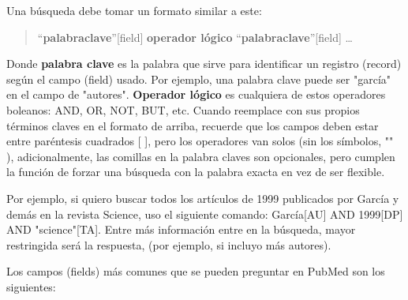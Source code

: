 \documentclass[letter,11pt]{book}
\begin{document}
 Una búsqueda debe tomar un formato similar a este:

\begin{quote}
``\textbf{palabraclave}''[field] \textbf{operador lógico}  ``\textbf{palabraclave}''[field] \ldots
\end{quote}

Donde \textbf{palabra clave} es la palabra que sirve para identificar un registro (record) según el campo (field) usado.  Por ejemplo, una palabra clave puede ser "garcía" en el campo de "autores". \textbf{Operador lógico} es cualquiera de estos operadores boleanos: AND, OR, NOT, BUT, etc.  Cuando reemplace con sus propios términos claves en el formato de arriba, recuerde que los campos deben estar entre paréntesis cuadrados [ ], pero los operadores van solos (sin los símbolos, "" ), adicionalmente, las comillas en la palabra claves son opcionales, pero cumplen la función de forzar una búsqueda con la palabra exacta en vez de ser flexible.

Por ejemplo, si quiero buscar todos los artículos de 1999 publicados por García y demás en la revista Science, uso el siguiente comando: García[AU] AND 1999[DP] AND "science"[TA].  Entre más información entre en la búsqueda, mayor restringida será la respuesta, (por ejemplo, si incluyo más autores).

Los campos (fields) más comunes que se pueden preguntar en PubMed son los siguientes:
\end{document}
